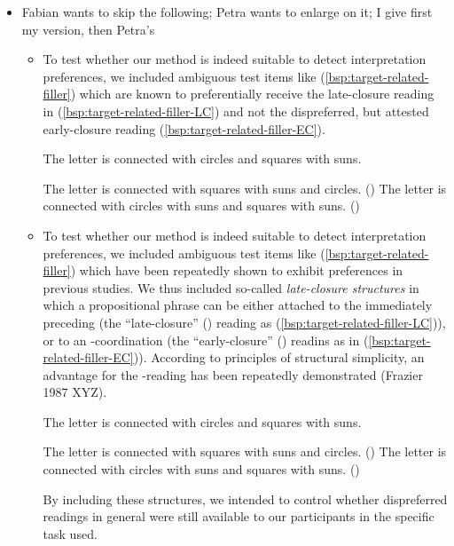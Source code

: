 \documentclass[fleqn,reqno,10pt,draft]{article}
\newcommand{\lc}{\acro{lc}}
\newcommand{\ec}{\acro{ec}}
\newcommand{\LC}{\lc}
\newcommand{\EC}{\ec}
\begin{document}
\begin{itemize}
\item Fabian wants to skip the following; Petra wants to enlarge on
  it; I give first my version, then Petra's
  \begin{itemize}
  \item To test whether our method is indeed suitable to detect
    interpretation preferences, we included ambiguous test items like
    (\ref{bsp:target-related-filler}) which are known to
    preferentially receive the late-closure reading in
    (\ref{bsp:target-related-filler-LC}) and not the dispreferred, but
    attested early-closure reading
    (\ref{bsp:target-related-filler-EC}).

    \begin{exe}
    \ex \label{bsp:target-related-filler} The letter is connected with circles and squares with
      suns.
      \begin{xlist}
      \ex \label{bsp:target-related-filler-LC} The letter is connected
        with squares with suns and circles. \hfill (\LC)
      \ex \label{bsp:target-related-filler-EC} The letter is connected
        with circles with suns and squares with suns. \hfill (\EC)
      \end{xlist}
    \end{exe}
  \item To test whether our method is indeed suitable to detect
    interpretation preferences, we included ambiguous test items like
    (\ref{bsp:target-related-filler}) which have been repeatedly shown
    to exhibit preferences in previous studies. We thus included
    so-called \emph{late-closure structures} in which a propositional
    phrase can be either attached to the immediately preceding
     (the ``late-closure'' (\LC) reading as
    (\ref{bsp:target-related-filler-LC})), or to an
    -coordination (the ``early-closure'' (\EC) readins as in
    (\ref{bsp:target-related-filler-EC})). According to principles of
    structural simplicity, an advantage for the \LC-reading has been
    repeatedly demonstrated (Frazier 1987 XYZ).
    \begin{exe}
    \ex \label{bsp:target-related-filler} The letter is connected with circles and squares with
      suns.
      \begin{xlist}
      \ex \label{bsp:target-related-filler-LC} The letter is connected
        with squares with suns and circles. \hfill (\LC)
      \ex \label{bsp:target-related-filler-EC} The letter is connected
        with circles with suns and squares with suns. \hfill (\EC)
      \end{xlist}
    \end{exe}
    By including these structures, we intended to control whether
    dispreferred readings in general were still available to our
    participants in the specific task used.

\end{itemize}
\end{itemize}
 
\end{document}
